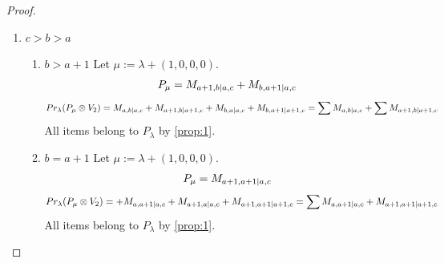 \begin{proof}
\begin{enumerate}
\begin{enumerate}
\item $c=a+1,b=c+1$
   Let $\mu:=\lambda + (0,0,1,1) $. 
\begin{equation}\notag
  \begin{aligned}
      P_{\mu} =M_{a+2,a+2|a,a+1}
  \end{aligned}
\end{equation}
\begin{equation}\notag
  \begin{aligned}
  Pr_{\lambda}(P_\mu \otimes V_1) &=
M_{a+2,a+2|a+1,a+2}
+M_{a+1,a+2|a+1,a+1}\\
                                  &+
M_{a+2,a+1|a+1,a+1}
+M_{a,a+2|a,a+1}
+M_{a+2,a|a,a+1} \\
                                  &=
\sum M_{a,a+2|a,a+1}
+\sum M_{a+1,a+2|a+1,a+1}
+ M_{a+2,a+2|a+1,a+2}
  \end{aligned}
\end{equation}
All items belong to $P_\lambda$ by \cref{prop:1}.

  \end{enumerate}
  
\item $c>b>a$
  \begin{enumerate}
    \item $b>a+1$
        Let $\mu:=\lambda + (1,0,0,0) $. 
\begin{equation}\notag
  \begin{aligned}
      P_{\mu} =M_{a+1,b|a,c}
+M_{b,a+1|a,c}
  \end{aligned}
\end{equation}
\begin{equation}\notag
  \begin{aligned}
  Pr_{\lambda}(P_\mu \otimes V_2) &=
M_{a,b|a,c}
+M_{a+1,b|a+1,c}
+M_{b,a|a,c}
+M_{b,a+1|a+1,c}
                                  =
\sum M_{a,b|a,c}
+\sum M_{a+1,b|a+1,c}
  \end{aligned}
\end{equation}
All items belong to $P_\lambda$ by \cref{prop:1}.
    
\item $b=a+1$
        Let $\mu:=\lambda + (1,0,0,0) $. 
\begin{equation}\notag
  \begin{aligned}
      P_{\mu} =M_{a+1,a+1|a,c}
  \end{aligned}
\end{equation}
\begin{equation}\notag
  \begin{aligned}
  Pr_{\lambda}(P_\mu \otimes V_2) &=
+M_{a,a+1|a,c}
+M_{a+1,a|a,c}
+M_{a+1,a+1|a+1,c}
                                  =
\sum M_{a,a+1|a,c}
+ M_{a+1,a+1|a+1,c}
  \end{aligned}
\end{equation}
All items belong to $P_\lambda$ by \cref{prop:1}.
  \end{enumerate}

\end{enumerate}
\end{proof}

